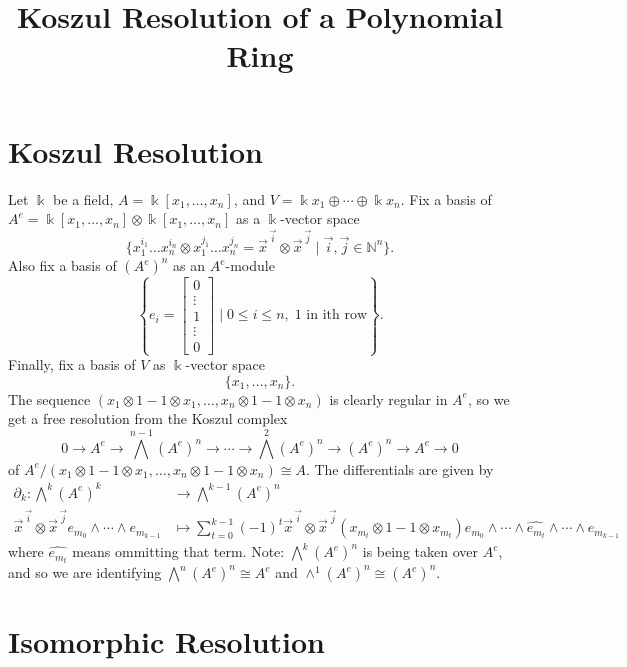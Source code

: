 \documentclass[12pt,a4paper]{article}
\title{Koszul Resolution of a Polynomial Ring}
\date{}
\newcommand\NN{\mathbb{N}}
\newcommand{\kk}{\Bbbk}
\newcommand\1{_{(1)}}
\newcommand\2{_{(2)}}
\begin{document}
\maketitle

\section{Koszul Resolution}

Let $\kk$ be a field, $A=\kk[x_1,\ldots,x_n]$, and $V=\kk x_1\oplus\cdots\oplus\kk x_n$.
Fix a basis of \\$A^e=\kk[x_1,\ldots,x_n]\otimes\kk[x_1,\ldots,x_n]$ as a $\kk$-vector space
\[
\{x_1^{i_1}\ldots x_n^{i_n}\otimes x_1^{j_1}\ldots x_n^{j_n}=\vec{x}^{\,\vec{i}}\otimes\vec{x}^{\,\vec{j}}\;\vert\; \vec{i},\vec{j}\in\NN^n\}.
\]
Also fix a basis of $\left(A^e\right)^n$ as an $A^e$-module
\[
\left\{e_i=\begin{bmatrix}0\\\vdots\\1\\\vdots\\0\end{bmatrix}\;\Bigg\vert\; 0\le i\le n, \;1\text{\ in ith row}\right\}.
\]
Finally, fix a basis of $V$ as $\kk$-vector space
\[
\{x_1,\ldots,x_n\}.
\]
The sequence $(x_1\otimes 1-1\otimes x_1,\ldots,x_n\otimes1-1\otimes x_n)$ is clearly regular in $A^e$, so we get a free resolution from the Koszul complex
\[
  0\to A^e\to\bigwedge^{n-1} \left(A^e\right)^n\to\cdots\to\bigwedge^2\left(A^e\right)^n\to\left(A^e\right)^n\to A^e\to 0
\]
of $A^e/(x_1\otimes1-1\otimes x_1,\ldots,x_n\otimes1-1\otimes x_n)\cong A$.
The differentials are given by
\begin{align*}
 \partial_k:\bigwedge^k \left(A^e\right)^k&\to\bigwedge^{k-1}\left(A^e\right)^n\\
  \vec{x}^{\,\vec{i}}\otimes\vec{x}^{\,\vec{j}}e_{m_0}\wedge\cdots\wedge e_{m_{k-1}}&\mapsto\sum_{t=0}^{k-1} (-1)^t\vec{x}^{\,\vec{i}}\otimes\vec{x}^{\,\vec{j}}(x_{m_t}\otimes1-1\otimes x_{m_t})e_{m_0}\wedge\cdots\wedge\widehat{e_{m_t}}\wedge\cdots\wedge e_{m_{k-1}}
\end{align*}
where $\widehat{e_{m_t}}$ means ommitting that term.
Note: $\bigwedge^{k}\left(A^e\right)^n$ is being taken over $A^e$, and so we are identifying $\bigwedge^n\left(A^e\right)^n\cong A^e$ and $\wedge^1\left(A^e\right)^n\cong \left(A^e\right)^n$.

\section{Isomorphic Resolution}
\end{document}
